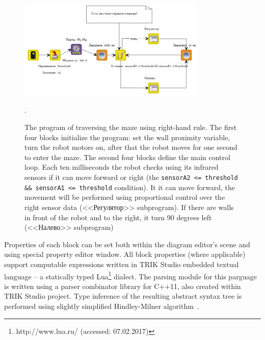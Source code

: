 \documentclass[conference]{IEEEtran}
\begin{document}
\begin{figure}[ht]
    \centering
    \includegraphics[width=0.8\textwidth]{TS_CF_Labyrinth_Diagram.png}
    \caption{The program of traversing the maze using right-hand rule. The first four blocks initialize the program: set the wall proximity variable, turn the robot motors on, after that the robot moves for one second to enter the maze. The second four blocks define the main control loop. Each ten milliseconds the robot checks using its infrared sensors if it can move forward or right (the \texttt{sensorA2 <= threshold \&\& sensorA1 <= threshold} condition). It it can move forward, the movement will be performed using proportional control over the right sensor data (<<Регулятор>> subprogram). If there are walls in front of the robot and to the right, it turn 90 degrees left (<<Налево>> subprogram)}.
    \label{image:TS_CF_Example}
\end{figure}

Properties of each block can be set both within the diagram editor's scene and using special property editor window. All block properties (where applicable) support computable expressions written in TRIK Studio embedded textual language -- a statically typed Lua\footnote{http://www.lua.ru/ (accessed: 07.02.2017)} dialect. The parsing module for this parguage is written using a parser combinator library for C++11, also created within TRIK Studio project. Type inference of the resulting abstract syntax tree is performed using slightly simplified Hindley-Milner algorithm~\cite{damas1982principal}.
\end{document}
